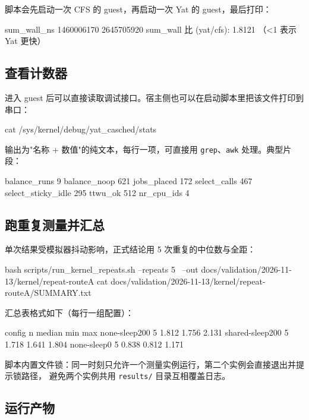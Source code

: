 \documentclass[11pt,a4paper]{article}
\newcommand{\code}[1]{\texttt{#1}}
\newenvironment{shell}{\Verbatim[fontsize=\small,frame=single,framesep=4pt]}{\endVerbatim}
\begin{document}
脚本会先启动一次 CFS 的 guest，再启动一次 Yat 的 guest，最后打印：

\begin{shell}
sum_wall_ns     1460006170       2645705920
sum_wall 比 (yat/cfs): 1.8121   （<1 表示 Yat 更快）
\end{shell}

\subsection{查看计数器}

进入 guest 后可以直接读取调试接口。宿主侧也可以在启动脚本里把该文件打印到串口：

\begin{shell}
cat /sys/kernel/debug/yat_casched/stats
\end{shell}

输出为"名称 + 数值"的纯文本，每行一项，可直接用 \code{grep}、\code{awk} 处理。典型片段：

\begin{shell}
balance_runs      9
balance_noop      621
jobs_placed       172
select_calls      467
select_sticky_idle 295
ttwu_ok           512
nr_cpu_ids        4
\end{shell}

\subsection{跑重复测量并汇总}

单次结果受模拟器抖动影响，正式结论用 5 次重复的中位数与全距：

\begin{shell}
bash scripts/run_kernel_repeats.sh --repeats 5 \
     --out docs/validation/2026-11-13/kernel/repeat-routeA
cat docs/validation/2026-11-13/kernel/repeat-routeA/SUMMARY.txt
\end{shell}

汇总表格式如下（每行一组配置）：

\begin{shell}
config                n     median        min        max
none-sleep200         5      1.812      1.756      2.131
shared-sleep200       5      1.718      1.641      1.804
none-sleep0           5      0.838      0.812      1.171
\end{shell}

脚本内置文件锁：同一时刻只允许一个测量实例运行，第二个实例会直接退出并提示锁路径，
避免两个实例共用 \code{results/} 目录互相覆盖日志。
\subsection{运行产物}
\end{document}
